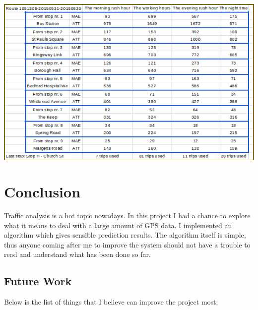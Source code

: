 \documentclass[12pt,a4paper,oneside,openright]{report}
\begin{document}
\includegraphics[scale=1.0]{figs/table_of_1051308.png}

\chapter{Conclusion}

Traffic analysis is a hot topic nowadays. In this project I had a chance to explore what it
means to deal with a large amount of GPS data. I implemented an algorithm which gives
sensible prediction results. The algorithm itself is simple, thus anyone coming after me
to improve the system should not have a trouble to read and understand what has been done
so far. \\

\section{Future Work}

Below is the list of things that I believe can improve the project most:
\end{document}
